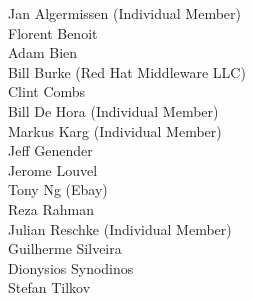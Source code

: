 Jan Algermissen (Individual Member) \\
Florent Benoit \\
Adam Bien \\
Bill Burke (Red Hat Middleware LLC) \\
Clint Combs \\
Bill De Hora (Individual Member) \\ 
Markus Karg (Individual Member) \\
Jeff Genender \\
Jerome Louvel \\
Tony Ng (Ebay) \\
Reza Rahman \\
Julian Reschke (Individual Member) \\
Guilherme Silveira \\
Dionysios Synodinos \\
Stefan Tilkov


